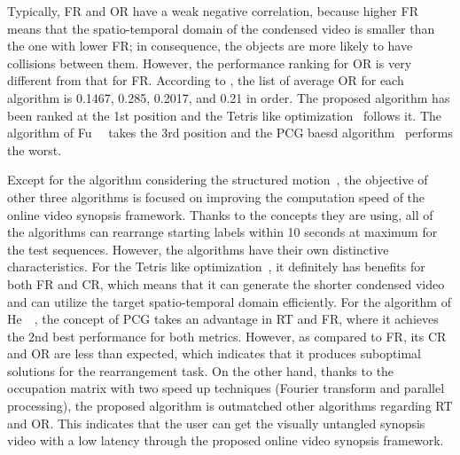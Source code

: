 \documentclass[11pt]{hyu_thesis}
\begin{document}
Typically, FR and OR have a weak negative correlation, because higher FR means that the spatio-temporal domain of the condensed video is smaller than the one with lower FR; in consequence, the objects are more likely to have collisions between them. However, the performance ranking for OR is very different from that for FR. According to , the list of average OR for each algorithm is 0.1467, 0.285, 0.2017, and 0.21 in order. The proposed algorithm has been ranked at the 1st position and the Tetris like optimization~\cite{Zhu2015} follows it. The algorithm of Fu~\etal~\cite{Fu2014} takes the 3rd position and the PCG baesd algorithm~\cite{He2017} performs the worst.

Except for the algorithm considering the structured motion~\cite{Fu2014}, the objective of other three algorithms is focused on improving the computation speed of the online video synopsis framework. Thanks to the concepts they are using, all of the algorithms can rearrange starting labels within 10 seconds at maximum for the test sequences. However, the algorithms have their own distinctive characteristics. For the Tetris like optimization~\cite{Zhu2015}, it definitely has benefits for both FR and CR, which means that it can generate the shorter condensed video and can utilize the target spatio-temporal domain efficiently. For the algorithm of He~\etal~\cite{He2017}, the concept of PCG takes an advantage in RT and FR, where it achieves the 2nd best performance for both metrics. However, as compared to FR, its CR and OR are less than expected, which indicates that it produces suboptimal solutions for the rearrangement task. On the other hand, thanks to the occupation matrix with two speed up techniques (Fourier transform and parallel processing), the proposed algorithm is outmatched other algorithms regarding RT and OR. This indicates that the user can get the visually untangled synopsis video with a low latency through the proposed online video synopsis framework.

\tableVCOne
{}\tableVCTwo
{}\tableVCThree
{}\tableVCFour
{}\tableVCFive
{}\tableVCSix
\end{document}
